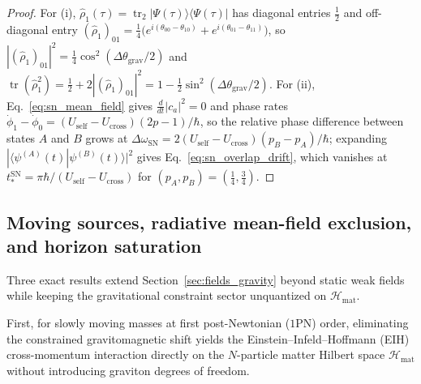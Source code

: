 \documentclass[aps,prd,onecolumn,tightenlines,nofootinbib,notitlepage,11pt,floatfix]{revtex4-2}
\theoremstyle{indentedtheorem}
\begin{document}
\begin{proof}
For (i), $\hat{\rho}_1(\tau) = \operatorname{tr}_2|\Psi(\tau)\rangle\langle\Psi(\tau)|$ has diagonal entries $\tfrac{1}{2}$ and off-diagonal entry $(\hat{\rho}_1)_{01} = \tfrac{1}{4}\big(e^{i(\theta_{00}-\theta_{10})} + e^{i(\theta_{01}-\theta_{11})}\big)$, so $|(\hat{\rho}_1)_{01}|^2 = \tfrac{1}{4}\cos^2(\Delta\theta_\text{grav}/2)$ and $\operatorname{tr}(\hat{\rho}_1^2) = \tfrac{1}{2} + 2|(\hat{\rho}_1)_{01}|^2 = 1 - \tfrac{1}{2}\sin^2(\Delta\theta_\text{grav}/2)$. For (ii), Eq.~\eqref{eq:sn_mean_field} gives $\frac{d}{dt}|c_a|^2 = 0$ and phase rates $\dot{\phi}_1-\dot{\phi}_0 = (U_\text{self}-U_\text{cross})(2p-1)/\hbar$, so the relative phase difference between states $A$ and $B$ grows at $\Delta\omega_\text{SN} = 2(U_\text{self}-U_\text{cross})(p_B-p_A)/\hbar$; expanding $|\langle\psi^{(A)}(t)|\psi^{(B)}(t)\rangle|^2$ gives Eq.~\eqref{eq:sn_overlap_drift}, which vanishes at $t_*^\text{SN}=\pi\hbar/(U_\text{self}-U_\text{cross})$ for $(p_A,p_B)=(\tfrac{1}{4},\tfrac{3}{4})$.
\end{proof}

\subsection{Moving sources, radiative mean-field exclusion, and horizon saturation}
\label{sec:dynamical_gravity}

Three exact results extend Section~\ref{sec:fields_gravity} beyond static weak fields while keeping the gravitational constraint sector unquantized on $\mathcal{H}_\text{mat}$.

First, for slowly moving masses at first post-Newtonian ($1$PN) order, eliminating the constrained gravitomagnetic shift yields the Einstein--Infeld--Hoffmann (EIH) cross-momentum interaction directly on the $N$-particle matter Hilbert space $\mathcal{H}_\text{mat}$ without introducing graviton degrees of freedom.
\end{document}
